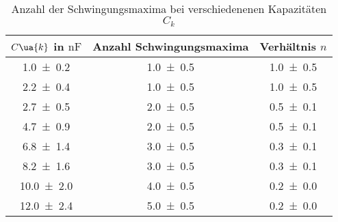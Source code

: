\begin{table} 
\centering 
\caption{ Anzahl der Schwingungsmaxima bei verschiedenenen Kapazitäten $C_k$} 
\label{fig:teila_n_ck} 
\begin{tabular}{S S S } 
\toprule  
{$C\ua{k}$ in $\si{\nano\farad}$} & {Anzahl Schwingungsmaxima} & {Verhältnis $n$}  \\ 
\midrule  
\num{1.0\pm0.2} & \num{1.0\pm0.5} & \num{1.0\pm0.5}\\ 
\num{2.2\pm0.4} & \num{1.0\pm0.5} & \num{1.0\pm0.5}\\ 
\num{2.7\pm0.5} & \num{2.0\pm0.5} & \num{0.5\pm0.1}\\ 
\num{4.7\pm0.9} & \num{2.0\pm0.5} & \num{0.5\pm0.1}\\ 
\num{6.8\pm1.4} & \num{3.0\pm0.5} & \num{0.3\pm0.1}\\ 
\num{8.2\pm1.6} & \num{3.0\pm0.5} & \num{0.3\pm0.1}\\ 
\num{10.0\pm2.0} & \num{4.0\pm0.5} & \num{0.2\pm0.0}\\ 
\num{12.0\pm2.4} & \num{5.0\pm0.5} & \num{0.2\pm0.0}\\ 
\bottomrule 
\end{tabular} 
\end{table}

